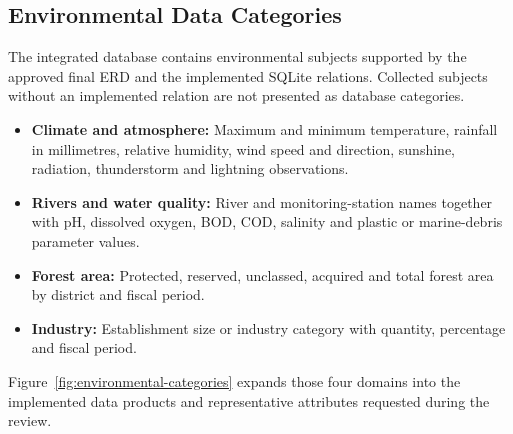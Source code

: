 





\subsection{Environmental Data Categories}
\label{subsec:data-categories}

The integrated database contains environmental subjects supported by the
approved final ERD and the implemented SQLite relations. Collected subjects
without an implemented relation are not presented as database categories.

\begin{itemize}[leftmargin=*,nosep]
  \item \textbf{Climate and atmosphere:} Maximum and minimum temperature,
  rainfall in millimetres, relative humidity, wind speed and direction,
  sunshine, radiation, thunderstorm and lightning observations.
  \item \textbf{Rivers and water quality:} River and monitoring-station names
  together with pH, dissolved oxygen, BOD, COD, salinity and plastic or
  marine-debris parameter values.
  \item \textbf{Forest area:} Protected, reserved, unclassed, acquired and
  total forest area by district and fiscal period.
  \item \textbf{Industry:} Establishment size or industry category with
  quantity, percentage and fiscal period.
\end{itemize}

Figure~\ref{fig:environmental-categories} expands those four domains into the
implemented data products and representative attributes requested during the
review.

